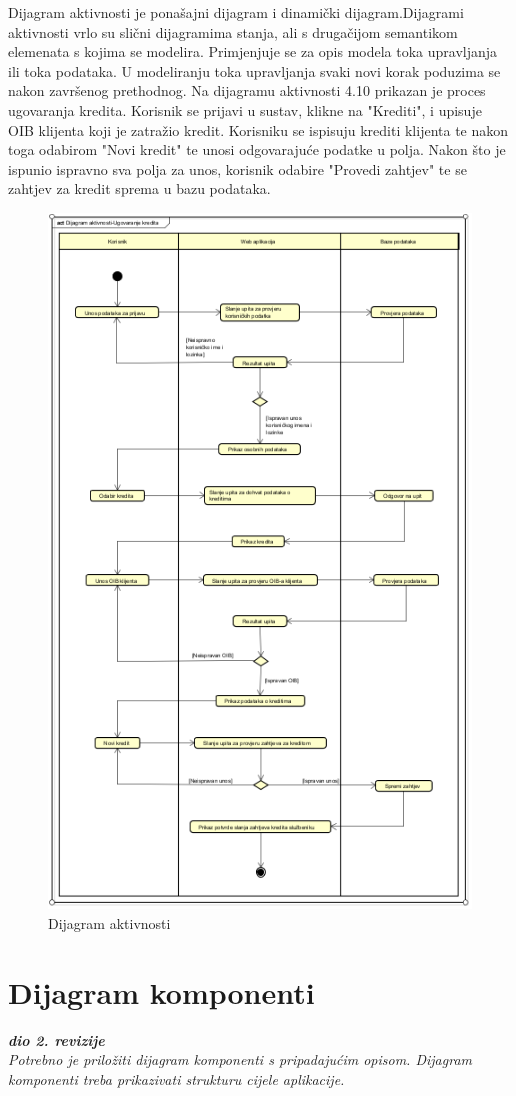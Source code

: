 		Dijagram aktivnosti je ponašajni dijagram i dinamički dijagram.Dijagrami aktivnosti vrlo su slični dijagramima stanja, ali s drugačijom
		semantikom elemenata s kojima se modelira. Primjenjuje se za opis modela toka upravljanja ili toka podataka. U modeliranju toka upravljanja svaki novi korak poduzima se nakon završenog prethodnog. Na dijagramu aktivnosti 4.10 prikazan je proces ugovaranja kredita. Korisnik se prijavi u sustav, klikne na "Krediti", i upisuje OIB klijenta koji je zatražio kredit. Korisniku se ispisuju krediti klijenta te nakon toga odabirom "Novi kredit" te unosi odgovarajuće podatke u polja. Nakon što je ispunio ispravno sva polja za unos, korisnik odabire "Provedi zahtjev" te se zahtjev za kredit sprema u bazu podataka.
		
			\begin{figure}[H]
			\includegraphics[scale=0.8]{Slike/dijagramAktivnosti.PNG}
			\centering
			\caption{Dijagram aktivnosti}
			\label{fig:dijagram}
		\end{figure}
	
		\section{Dijagram komponenti}
		
			\textbf{\textit{dio 2. revizije}}\\
		
			 \textit{Potrebno je priložiti dijagram komponenti s pripadajućim opisom. Dijagram komponenti treba prikazivati strukturu cijele aplikacije.}